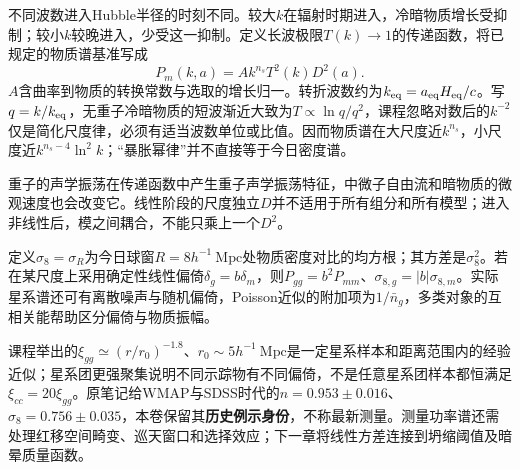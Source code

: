 不同波数进入Hubble半径的时刻不同。较大$k$在辐射时期进入，冷暗物质增长受抑制；较小$k$较晚进入，少受这一抑制。定义长波极限$T(k)\to1$的传递函数，将已规定的物质谱基准写成
\[
 P_m(k,a)=A k^{n_s}T^2(k)D^2(a).
\]
$A$含曲率到物质的转换常数与选取的增长归一。转折波数约为$k_{\rm eq}=a_{\rm eq}H_{\rm eq}/c$。写$q=k/k_{\rm eq}$，无重子冷暗物质的短波渐近大致为$T\propto\ln q/q^2$，课程忽略对数后的$k^{-2}$仅是简化尺度律，必须有适当波数单位或比值。因而物质谱在大尺度近$k^{n_s}$，小尺度近$k^{n_s-4}\ln^2 k$；“暴胀幂律”并不直接等于今日密度谱。

重子的声学振荡在传递函数中产生重子声学振荡特征，中微子自由流和暗物质的微观速度也会改变它。线性阶段的尺度独立$D$并不适用于所有组分和所有模型；进入非线性后，模之间耦合，不能只乘上一个$D^2$。

定义$\sigma_8=\sigma_R$为今日球窗$R=8h^{-1}\ \mathrm{Mpc}$处物质密度对比的均方根；其方差是$\sigma_8^2$。若在某尺度上采用确定性线性偏倚$\delta_g=b\delta_m$，则$P_{gg}=b^2P_{mm}$、$\sigma_{8,g}=|b|\sigma_{8,m}$。实际星系谱还可有离散噪声与随机偏倚，Poisson近似的附加项为$1/\bar n_g$，多类对象的互相关能帮助区分偏倚与物质振幅。

课程举出的$\xi_{gg}\simeq(r/r_0)^{-1.8}$、$r_0\sim5h^{-1}\ \mathrm{Mpc}$是一定星系样本和距离范围内的经验近似；星系团更强聚集说明不同示踪物有不同偏倚，不是任意星系团样本都恒满足$\xi_{cc}=20\xi_{gg}$。原笔记给WMAP与SDSS时代的$n=0.953\pm0.016$、$\sigma_8=0.756\pm0.035$，本卷保留其\textbf{历史例示身份}，不称最新测量。测量功率谱还需处理红移空间畸变、巡天窗口和选择效应；下一章将线性方差连接到坍缩阈值及暗晕质量函数。
